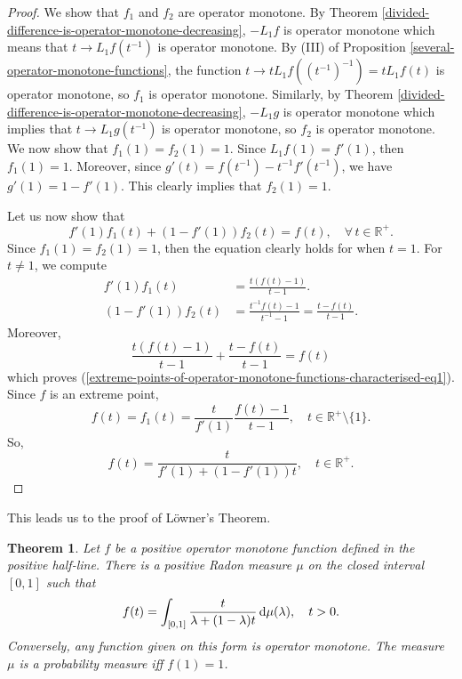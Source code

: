 \documentclass[12pt,a4paper]{amsart}
\newtheorem{theorem}{Theorem}
\theoremstyle{definition}
\begin{document}
\begin{proof}
		We show that $f_1$ and $f_2$ are operator monotone. By Theorem \ref{divided-difference-is-operator-monotone-decreasing}, $-L_1f$ is operator monotone  which means that $t \rightarrow L_1f(t^{-1}) $ is operator monotone. By (III) of Proposition \ref{several-operator-monotone-functions}, the function $t \rightarrow tL_1f((t^{-1})^{-1}) = tL_1f(t) $ is operator monotone, so $f_1$ is operator monotone. Similarly, by Theorem \ref{divided-difference-is-operator-monotone-decreasing}, $-L_1g$ is operator monotone  which implies that $t \rightarrow L_1g(t^{-1})$ is operator monotone, so $f_2$ is operator monotone. We now show that $f_1(1)=f_2(1)=1$. Since $L_1f(1) = f'(1)$, then $f_1(1)=1$. Moreover, since $g'(t) = f(t^{-1}) - t^{-1}f'(t^{-1})$, we have $g'(1) = 1  - f'(1)$. This clearly implies that $f_2(1) =1$.
		\par
		Let us now show that
		\begin{equation}\label{extreme-points-of-operator-monotone-functions-characterised-eq1}
			f'(1) f_1(t) + (1-f'(1)) f_2(t) = f(t), \quad \forall \, t \in \mathbb{R}^{+}. 
		\end{equation}
		Since $f_1(1) = f_2(1) = 1$, then the equation clearly holds for when $t=1$. For $t \neq 1$, we compute
		\begin{align*}
			f'(1) f_1(t)  & =  \frac{t(f(t)-1)}{t-1}.    \\
			(1-f'(1)) f_2(t)  & =  \frac{t^{-1}f(t)-1}{t^{-1}-1} = \frac{t -f(t)}{t-1}.   
		\end{align*} 
		Moreover, 
		\[  \frac{t(f(t)-1)}{t-1}  + \frac{t -f(t)}{t-1} = f(t) \]
		which proves (\ref{extreme-points-of-operator-monotone-functions-characterised-eq1}).
		Since $f$ is an extreme point, 
		\[ f(t) = f_1(t) = \frac{t}{f'(1)} \frac{f(t) - 1}{t-1}, \quad t \in \mathbb{R}^{+} \setminus \lbrace1\rbrace. \]
		So, 
		\[ f(t) = \frac{t}{f'(1) + (1-f'(1))t}, \quad t \in \mathbb{R}^{+}.  \]
	\end{proof}
	This leads us to the proof of L\"owner's Theorem.
	\begin{theorem}
		Let $f$ be a positive operator monotone function defined in the positive half-line. There is a  positive Radon measure $\mu$ on the closed interval $[0,1]$ such that 
		\begin{equation*}
			f(t) = \int_{[0,1]} \frac{t}{\lambda + (1-\lambda)t}  \,  {\rm d} \mu(\lambda), \quad t > 0.
		\end{equation*}
		Conversely, any function given on this form is operator monotone. The measure $\mu$ is a probability measure iff $f(1) =1$.
	\end{theorem}
\end{document}

